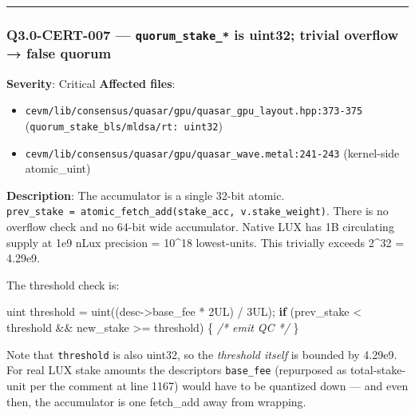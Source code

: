 \documentclass[
]{article}
\newenvironment{Shaded}{}{}
\newcommand{\BuiltInTok}[1]{\textcolor[rgb]{0.00,0.50,0.00}{#1}}
\newcommand{\CommentTok}[1]{\textcolor[rgb]{0.38,0.63,0.69}{\textit{#1}}}
\newcommand{\ControlFlowTok}[1]{\textcolor[rgb]{0.00,0.44,0.13}{\textbf{#1}}}
\newcommand{\DecValTok}[1]{\textcolor[rgb]{0.25,0.63,0.44}{#1}}
\newcommand{\NormalTok}[1]{#1}
\newcommand{\OperatorTok}[1]{\textcolor[rgb]{0.40,0.40,0.40}{#1}}
\providecommand{\tightlist}{%
  \setlength{\itemsep}{0pt}\setlength{\parskip}{0pt}}
\begin{document}
\begin{center}\rule{0.5\linewidth}{0.5pt}\end{center}

\subsubsection{\texorpdfstring{Q3.0-CERT-007 ---
\texttt{quorum\_stake\_*} is uint32; trivial overflow → false
quorum}{Q3.0-CERT-007 --- quorum\_stake\_* is uint32; trivial overflow → false quorum}}\label{q30-cert-007--quorum_stake_-is-uint32-trivial-overflow--false-quorum}

\textbf{Severity}: Critical \textbf{Affected files}:

\begin{itemize}
\tightlist
\item
  \texttt{cevm/lib/consensus/quasar/gpu/quasar\_gpu\_layout.hpp:373-375}
  (\texttt{quorum\_stake\_bls/mldsa/rt:\ uint32})
\item
  \texttt{cevm/lib/consensus/quasar/gpu/quasar\_wave.metal:241-243}
  (kernel-side atomic\_uint)
\end{itemize}

\textbf{Description}: The accumulator is a single 32-bit atomic.
\texttt{prev\_stake\ =\ atomic\_fetch\_add(stake\_acc,\ v.stake\_weight)}.
There is no overflow check and no 64-bit wide accumulator. Native LUX
has 1B circulating supply at 1e9 nLux precision = 10\^{}18 lowest-units.
This trivially exceeds 2\^{}32 = 4.29e9.

The threshold check is:

\begin{Shaded}
\begin{Highlighting}[]
\NormalTok{uint threshold }\OperatorTok{=}\NormalTok{ uint}\OperatorTok{((}\NormalTok{desc}\OperatorTok{{-}\textgreater{}}\NormalTok{base\_fee }\OperatorTok{*} \DecValTok{2}\BuiltInTok{UL}\OperatorTok{)} \OperatorTok{/} \DecValTok{3}\BuiltInTok{UL}\OperatorTok{);}
\ControlFlowTok{if} \OperatorTok{(}\NormalTok{prev\_stake }\OperatorTok{\textless{}}\NormalTok{ threshold }\OperatorTok{\&\&}\NormalTok{ new\_stake }\OperatorTok{\textgreater{}=}\NormalTok{ threshold}\OperatorTok{)} \OperatorTok{\{} \CommentTok{/* emit QC */} \OperatorTok{\}}
\end{Highlighting}
\end{Shaded}

Note that \texttt{threshold} is also uint32, so the \emph{threshold
itself} is bounded by 4.29e9. For real LUX stake amounts the
descriptor\textquotesingle s \texttt{base\_fee} (repurposed as
total-stake-unit per the comment at line 1167) would have to be
quantized down --- and even then, the accumulator is one fetch\_add away
from wrapping.
\end{document}
